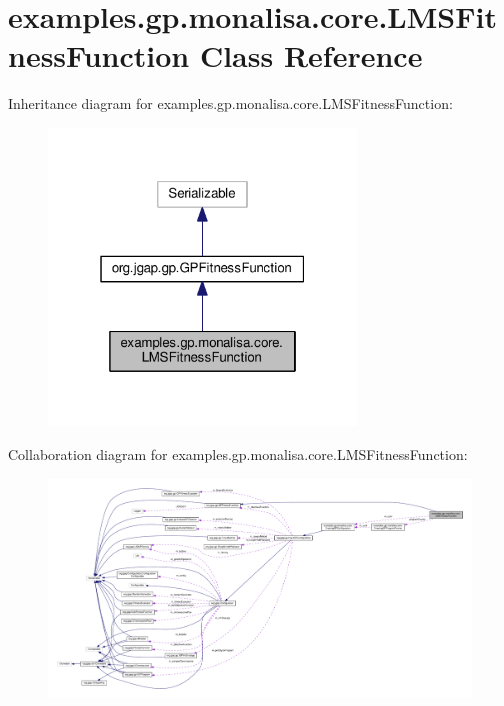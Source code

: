 \hypertarget{classexamples_1_1gp_1_1monalisa_1_1core_1_1_l_m_s_fitness_function}{\section{examples.\-gp.\-monalisa.\-core.\-L\-M\-S\-Fitness\-Function Class Reference}
\label{classexamples_1_1gp_1_1monalisa_1_1core_1_1_l_m_s_fitness_function}
}


Inheritance diagram for examples.\-gp.\-monalisa.\-core.\-L\-M\-S\-Fitness\-Function\-:
\nopagebreak
\begin{figure}[H]
\begin{center}
\leavevmode
\includegraphics[width=232pt]{classexamples_1_1gp_1_1monalisa_1_1core_1_1_l_m_s_fitness_function__inherit__graph}
\end{center}
\end{figure}


Collaboration diagram for examples.\-gp.\-monalisa.\-core.\-L\-M\-S\-Fitness\-Function\-:
\nopagebreak
\begin{figure}[H]
\begin{center}
\leavevmode
\includegraphics[width=350pt]{classexamples_1_1gp_1_1monalisa_1_1core_1_1_l_m_s_fitness_function__coll__graph}
\end{center}
\end{figure}
